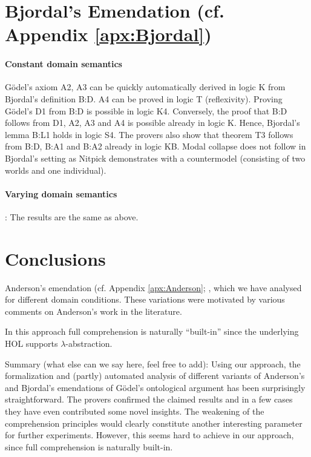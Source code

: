 \documentclass{birkjour}
\theoremstyle{definition}
\theoremstyle{remark}
\numberwithin{equation}{section}
\begin{document}

 
\section{Bjordal's Emendation (cf. Appendix \ref{apx:Bjordal})}


\paragraph{Constant domain semantics}
    G\"odel's axiom
  A2, A3 can be quickly automatically derived in logic K from
  Bjordal's definition B:D. A4 can be proved in logic T
  (reflexivity). Proving G\"odel's D1 from B:D is possible in logic
  K4. Conversely, the proof that B:D follows from D1, A2, A3 and
  A4 is possible already in logic K. Hence, Bjordal's lemma
  B:L1 holds in logic S4. The provers also show that theorem T3
  follows from B:D, B:A1 and B:A2 already in logic KB. Modal collapse
  does not follow in Bjordal's setting as Nitpick demonstrates with a
  countermodel (consisting of two worlds and one individual). 

\paragraph{Varying domain semantics}
: The results are
  the same as above. 


\section{Conclusions}

Anderson's emendation (cf. Appendix \ref{apx:Anderson}; ,
which we have analysed for different domain conditions. These
variations were motivated by various comments on Anderson's work in
the literature. 

In this approach full comprehension is
naturally ``built-in'' since the underlying HOL supports
$\lambda$-abstraction.

Summary (what else can we say here, feel free to add): Using our approach, the formalization and (partly) automated
analysis of different variants of Anderson's and Bjordal's emendations
of G\"odel's ontological argument has been surprisingly
straightforward. The provers confirmed the claimed results and in a
few cases they have even contributed some novel insights. The
weakening of the comprehension principles would clearly constitute
another interesting parameter for further experiments. However, this
seems hard to achieve in our approach, since full comprehension is
naturally built-in.
\end{document}
